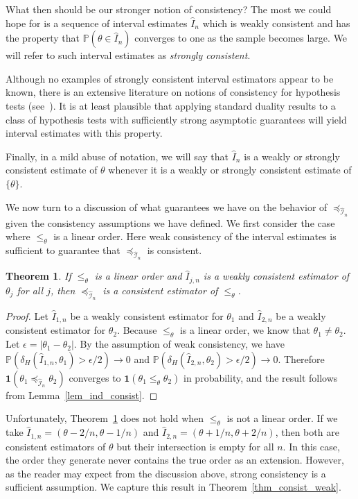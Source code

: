 \documentclass[12pt]{article}
\newcommand{\prob}[1]{\mathbb{P}(#1)}
\newcommand{\ind}[1]{\mathbf{1}(#1)}
\newcommand{\pord}{{\leqslant_{\theta}}}
\newcommand{\iordn}{{\preceq_{\hat{\mathcal{I}}_{n}}}}
\newtheorem{theorem}{Theorem}
\numberwithin{theorem}{section}
\begin{document}
What then should be our stronger notion of consistency?  The most we could hope for is a sequence of interval estimates $\hat{I}_n$ which is weakly consistent and has the property that $\prob{\theta \in \hat{I}_n}$ converges to one as the sample becomes large.  We will refer to such interval estimates as \emph{strongly consistent}.

Although no examples of strongly consistent interval estimators appear to be known, there is an extensive literature on notions of consistency for hypothesis tests (see~\cite{ermakov2017testing}).  It is at least plausible that applying standard duality results to a class of hypothesis tests with sufficiently strong asymptotic guarantees will yield interval estimates with this property.

Finally, in a mild abuse of notation, we will say that $\hat{I}_n$ is a weakly or strongly consistent estimate of $\theta$ whenever it is a weakly or strongly consistent estimate of $\{\theta\}$.

We now turn to a discussion of what guarantees we have on the behavior of $\iordn$ given the consistency assumptions we have defined.  We first consider the case where $\pord$ is a linear order.  Here weak consistency of the interval estimates is sufficient to guarantee that $\iordn$ is consistent.

\begin{theorem}
\label{thm_consist_linear}
If $\pord$ is a linear order and $\hat{I}_{j, n}$ is a weakly consistent estimator of $\theta_j$ for all $j$, then $\iordn$ is a consistent estimator of $\pord$.
\end{theorem}
\begin{proof}
Let $\hat{I}_{1, n}$ be a weakly consistent estimator for $\theta_1$ and $\hat{I}_{2, n}$ be a weakly consistent estimator for $\theta_2$.  Because $\pord$ is a linear order, we know that $\theta_1 \neq \theta_2$.  Let $\epsilon = |\theta_1 - \theta_2|$.  By the assumption of weak consistency, we have $\prob{\delta_H(\hat{I}_{1, n}, \theta_1) > \epsilon / 2} \rightarrow 0$ and $\prob{\delta_H(\hat{I}_{2, n}, \theta_2) > \epsilon / 2} \rightarrow 0$.  Therefore $\ind{\theta_1 \iordn \theta_2}$ converges to $\ind{\theta_1 \pord \theta_2}$ in probability, and the result follows from Lemma~\ref{lem_ind_consist}.
\end{proof}

Unfortunately, Theorem~\ref{thm_consist_linear} does not hold when $\pord$ is not a linear order.  If we take $\hat{I}_{1, n} = (\theta - 2 / n, \theta - 1 / n)$ and $\hat{I}_{2, n} = (\theta + 1 / n, \theta + 2 / n)$, then both are consistent estimators of $\theta$ but their intersection is empty  for all $n$.  In this case, the order they generate never contains the true order as an extension.  However, as the reader may expect from the discussion above, strong consistency is a sufficient assumption.  We capture this result in Theorem~\ref{thm_consist_weak}.
\end{document}
